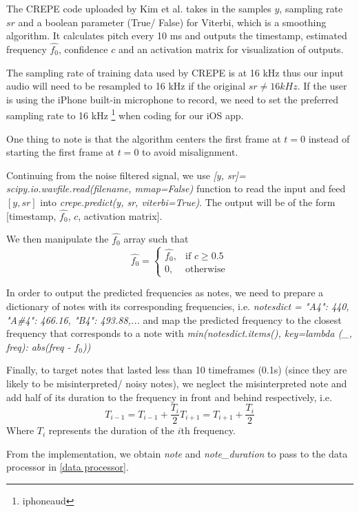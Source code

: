 The CREPE code uploaded by Kim et al. takes in the samples $y$, sampling rate $sr$ and a boolean parameter (True/ False) for Viterbi, which is a smoothing algorithm. 
It calculates pitch every 10 ms and outputs the timestamp, estimated frequency $\hat{f_0}$, confidence $c$ and an activation matrix for visualization of outputs. 

The sampling rate of training data used by CREPE is at 16 kHz thus our input audio will need to be resampled to 16 kHz if the original $sr \neq 16 kHz$. If the user is using the iPhone 
built-in microphone to record, we need to set the preferred sampling rate to 16 kHz \footnote{iphoneaud} when coding for our iOS app.

One thing to note is that the algorithm centers the first frame at $t=0$ instead of starting the first frame at $t=0$ to avoid misalignment.

Continuing from the noise filtered signal, we use \emph{[y, sr]= scipy.io.wavfile.read(filename, mmap=False)} function to read the input and feed $[y, sr]$ 
into \emph{crepe.predict(y, sr, viterbi=True)}.
The output will be of the form [timestamp, $\hat{f_0}$, $c$, activation matrix].

We then manipulate the $\hat{f_0}$ array such that
\[\hat{f_0}= 
\begin{cases}
    \hat{f_0},      & \text{if } c\geq 0.5\\
    0,              & \text{otherwise}
\end{cases}
\label{creperesult}
\]

In order to output the predicted frequencies as notes, we need to prepare a dictionary of notes with its corresponding frequencies, i.e. 
\emph{notesdict = {"A4": 440, "A\#4": 466.16, "B4": 493.88,...}}
and map the predicted frequency to the closest frequency that corresponds to a note with \emph{min(notesdict.items(), key=lambda (\_, freq): abs(freq - $f_0$))}
 
Finally, to target notes that lasted less than 10 timeframes (0.1s) (since they are likely to be misinterpreted/ noisy notes),
we neglect the misinterpreted note and add half of its duration to the frequency in front and behind respectively, i.e.
\[T_{i-1} = T_{i-1} + \frac{T_i}{2}
T_{i+1} = T_{i+1} + \frac{T_i}{2}
    \]
Where $T_i$ represents the duration of the $i$th frequency.

From the implementation, we obtain \emph{note} and \emph{note\_duration} to pass to the data processor in \cref{data processor}.

